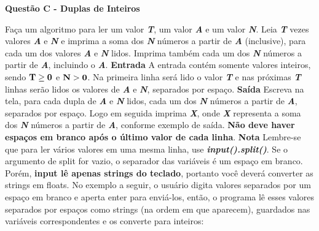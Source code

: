 \documentclass[a4paper, 12pt]{article}
\begin{document}
\newpage %
\begin{center}
\textbf{{\Large Questão C - Duplas de Inteiros}}
\end{center}
\vspace{5pt}
Faça um algoritmo para ler um valor \textbf{\textit{T}}, um valor \textbf{\textit{A}} e um valor \textbf{\textit{N}}. Leia \textbf{\textit{T}} vezes valores \textbf{\textit{A}} e \textbf{\textit{N}} e imprima a soma dos \textbf{\textit{N}} números a partir de \textbf{\textit{A}} (inclusive), para cada um dos valores \textbf{\textit{A}} e \textbf{\textit{N}} lidos. Imprima também cada um dos \textbf{\textit{N}} números a partir de \textbf{\textit{A}}, incluindo o \textbf{\textit{A}}.
\newline \newline
\textbf{{\large Entrada}} \newline
A entrada contém somente valores inteiros, sendo $\textrm{\textbf{T}} \geq \textrm{\textbf{0}}$ e $\textrm{\textbf{N}} > \textrm{\textbf{0}}$. Na primeira linha será lido o valor \textbf{\textit{T}} e nas próximas \textbf{\textit{T}} linhas serão lidos os valores de \textbf{\textit{A}} e \textbf{\textit{N}}, separados por espaço.
\newline \newline
\textbf{{\large Saída}} \newline
Escreva na tela, para cada dupla de \textbf{\textit{A}} e \textbf{\textit{N}} lidos, cada um dos \textbf{\textit{N}} números a partir de \textbf{\textit{A}}, separados por espaço. Logo em seguida imprima \textbf{\textit{X}}, onde \textbf{\textit{X}} representa a soma dos \textbf{\textit{N}} números a partir de \textbf{\textit{A}}, conforme exemplo de saída. \textbf{Não deve haver espaços em branco após o último valor de cada linha}.
\newline \newline
\textbf{{\large Nota}} \newline
Lembre-se que para ler vários valores em uma mesma linha, use \textbf{\textit{input().split()}}. Se o argumento de split for vazio, o separador das variáveis é um espaço em branco. Porém, \textbf{input lê apenas strings do teclado}, portanto você deverá converter as strings em floats. No exemplo a seguir, o usuário digita valores separados por um espaço em branco e aperta enter para enviá-los, então, o programa lê esses valores separados por espaços como strings (na ordem em que aparecem), guardados nas variáveis correspondentes e os converte para inteiros: \newline
\end{document}
